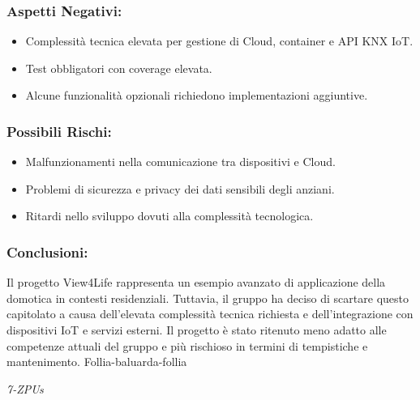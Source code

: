 \documentclass[a4paper,12pt]{article}
\begin{document}
\subsubsection*{Aspetti Negativi:}
\begin{itemize}
    \item Complessità tecnica elevata per gestione di Cloud, container e API KNX IoT.
    \item Test obbligatori con coverage elevata.
    \item Alcune funzionalità opzionali richiedono implementazioni aggiuntive.
\end{itemize}

\subsubsection*{Possibili Rischi:}
\begin{itemize}
    \item Malfunzionamenti nella comunicazione tra dispositivi e Cloud.
    \item Problemi di sicurezza e privacy dei dati sensibili degli anziani.
    \item Ritardi nello sviluppo dovuti alla complessità tecnologica.
\end{itemize}

\subsubsection*{Conclusioni:}
Il progetto View4Life rappresenta un esempio avanzato di applicazione della domotica in contesti residenziali. Tuttavia, il gruppo ha deciso di scartare questo capitolato a causa dell'elevata complessità tecnica richiesta e dell'integrazione con dispositivi IoT e servizi esterni. Il progetto è stato ritenuto meno adatto alle competenze attuali del gruppo e più rischioso in termini di tempistiche e mantenimento.
Follia-baluarda-follia
\vspace{0.5cm}

\vfill
\begin{flushright}
    \textit{7-ZPUs}
\end{flushright}
\end{document}
